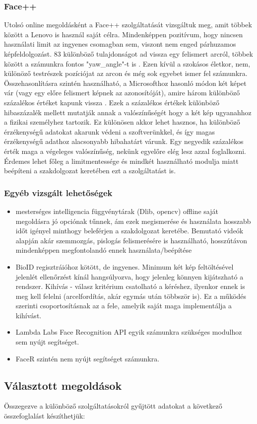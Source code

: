 \subsubsection{Face++}
Utolsó online megoldásként a Face++ szolgáltatását vizsgáltuk meg, amit többek között a Lenovo is használ saját célra. Mindenképpen pozitívum, hogy nincsen használati limit az ingyenes csomagban sem, viszont nem enged párhuzamos képfeldolgozást. 83 különböző tulajdonságot ad vissza egy felismert arcról, többek között a számunkra fontos "yaw\_angle"-t is \cite{FACEPP}. Ezen kívül a szokásos életkor, nem, különöző testrészek pozíciójat az arcon és még sok egyebet ismer fel számunkra.
\\Összehasonlításra szintén használható, a Microsofthoz hasonló módon két képet vár (vagy egy előre felismert képnek az azonosítóját), amire három különböző százalékos értéket kapunk vissza \cite{FACEPP_COMPARE}. Ezek a százalékos értékek különböző hibaszázalék mellett mutatják annak a valószínűségét hogy a két kép ugyanahhoz a fizikai személyhez tartozik. Ez különösen akkor lehet hasznos, ha különböző érzékenységű adatokat akarunk védeni a szoftverünkkel, és így magas érzékenységű adathoz alacsonyabb hibahatárt várunk. Egy negyedik százalékos érték maga a végeleges valószínűség, nekünk egyelőre elég lesz azzal foglalkozni. Érdemes lehet főleg a limitmentessége és mindkét használható modulja miatt beépíteni a szakdolgozat keretében ezt a szolgáltatást is. 

\subsubsection{Egyéb vizsgált lehetőségek}

\begin{itemize}
\item mesterséges intelligencia függvénytárak (Dlib, opencv) offline saját megoldásra jó opciónak tűnnek, ám ezek megismerése és használata hosszabb időt igényel minthogy beleférjen a szakdolgozat keretébe. Bemutató videók alapján akár szemmozgás, pislogás felismerésére is használható, hosszútávon mindenképpen megfontolandó ennek használata/beépítése
\item BioID regisztráióhoz kötött, de ingyenes. Minimum két kép feltöltésével jelenlét ellenőrzést kínál hangsúlyozva, hogy jelenleg könnyen kijátszható a rendszer. Kihívás - válasz kritérium csatolható a kéréshez, ilyenkor ennek is meg kell felelni (arcelfordítás, akár egymás után többször is). Ez a működés szerinti csoportosításnak az a fele, amelyik saját maga implementálja a kihívást.
\item Lambda Labs Face Recognition API egyik számunkra szükséges modulhoz sem nyújt segítséget.
\item FaceR szintén nem nyújt segítséget számunkra.
\end{itemize}

\subsection{Választott megoldások}
Összegezve a különböző szolgáltatásokról gyűjtött adatokat a következő összefoglalást készíthetjük:
\newpage